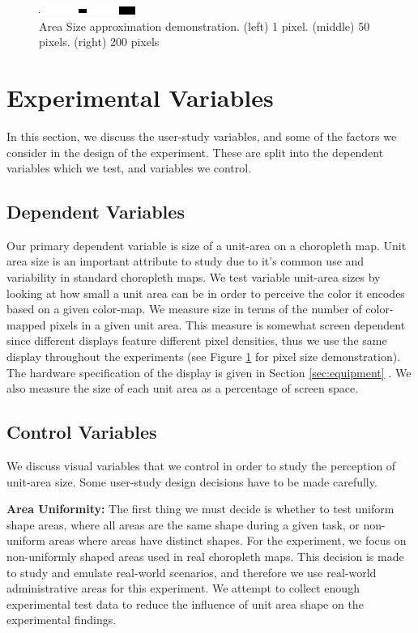 \begin{figure}[b]
\centering
\includegraphics[scale=1]{images/pixelSize} \vspace{0.1cm}
\caption{Area Size approximation demonstration.  (left) 1 pixel. (middle) 50 pixels. (right) 200 pixels} \label{fig:pixels}
\end{figure}
\section{Experimental Variables} \label{sec:variables}
In this section, we discuss the user-study variables, and some of the factors we consider in the design of the experiment. These are split into the dependent variables which we test, and variables we control.

\subsection{Dependent Variables}
Our primary dependent variable is size of a unit-area on a choropleth map. Unit area size is an important attribute to study due to it's common use and variability in standard choropleth maps. We test variable unit-area sizes by looking at how small a unit area can be in order to perceive the color it encodes based on a given color-map. We measure size in terms of the number of color-mapped pixels in a given unit area. This measure is somewhat screen dependent since different displays feature different pixel densities, thus we use the same display throughout the experiments (see Figure \ref{fig:pixels} for pixel size demonstration). The hardware specification of the display is given in Section \ref{sec:equipment} . We also measure the size of each unit area as a percentage of screen space.

\subsection{Control Variables}
We discuss visual variables that we control in order to study the perception of unit-area size. Some user-study design decisions have to be made carefully.

\textbf{Area Uniformity: } The first thing we must decide is whether to test uniform shape areas, where all areas are the same shape during a given task, or non-uniform areas where areas have distinct shapes. For the experiment, we focus on non-uniformly shaped areas used in real choropleth maps. This decision is made to study and emulate real-world scenarios, and therefore we use real-world administrative areas for this experiment. We attempt to collect enough experimental test data to reduce the influence of unit area shape on the experimental findings.

